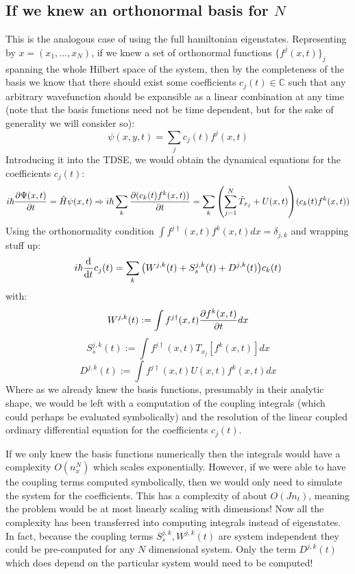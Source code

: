 \documentclass[11pt, a4paper]{article} %
\newcommand{\C}{\mathbb{C}}
\begin{document}
\subsection{If we knew an orthonormal basis for $N$}
This is the analogous case of using the full hamiltonian eigenstates. Representing by $x=(x_1,...,x_N)$, if we knew a set of orthonormal functions $\{f^j(x,t)\}_j$ spanning the whole Hilbert space of the system, then by the completeness of the basis we know that there should exist some coefficients $c_j(t)\in \C$ such that any arbitrary wavefunction should be expansible as a linear combination at any time (note that the basis functions need not be time dependent, but for the sake of generality we will consider so):
\begin{equation}
\psi(x,y,t)=\sum_j c_j(t) f^j(x,t)
\end{equation}
Introducing it into the TDSE, we would obtain the dynamical equations for the coefficients $c_j(t)$:
\begin{equation}
i\hbar \pdv{\Psi(x,t)}{t}=\hat{H}\psi(x,t)\Rightarrow i\hbar \sum_k\pdv{(c_k(t)f^k(x,t))}{t}=\sum_k\qty(\sum_{j=1}^N \hat{T}_{x_j} + U(x, t))(c_k(t)f^k(x,t))
\end{equation}
Using the orthonormality condition $\int f^{j\dagger}(x,t)f^k(x,t)dx=\delta_{j,k}$ and wrapping stuff up:
\begin{equation}
i\hbar\dv{}{t}c_j(t)=\sum_k\qty(W^{j,k}(t)+S^{j,k}_s(t)+D^{j,k}(t))c_k(t)
\end{equation}
with:
\begin{equation}
W^{j,k}(t):=\int f^{j\dagger}(x,t) \pdv{f^k(x,t)}{t} dx
\end{equation}
\begin{equation}
S^{j,k}_s(t):=\int f^{j\dagger}(x,t) T_{x_j}[f^k(x,t)] dx
\end{equation}
\begin{equation}
D^{j,k}(t):=\int f^{j\dagger}(x,t) U(x,t)f^k(x,t) dx
\end{equation}
Where as we already knew the basis functions, presumably in their analytic shape, we would be left with a computation of the coupling integrals (which could perhaps be evaluated symbolically) and the resolution of the linear coupled ordinary differential equation for the coefficients $c_j(t)$.

If we only knew the basis functions numerically then the integrals would have a complexity $O(n_x^N)$ which scales exponentially. However, if we were able to have the coupling terms computed symbolically, then we would only need to simulate the system for the coefficients. This has a complexity of about $O(Jn_t)$, meaning the problem would be at most linearly scaling with dimensions! Now all the complexity has been transferred into computing integrals instead of eigenstates. In fact, because the coupling terms $S^{j,k}_s, W^{j,k}(t)$ are system independent they could be pre-computed for any $N$ dimensional system. Only the term $D^{j,k}(t)$ which does depend on the particular system would need to be computed!
\end{document}
